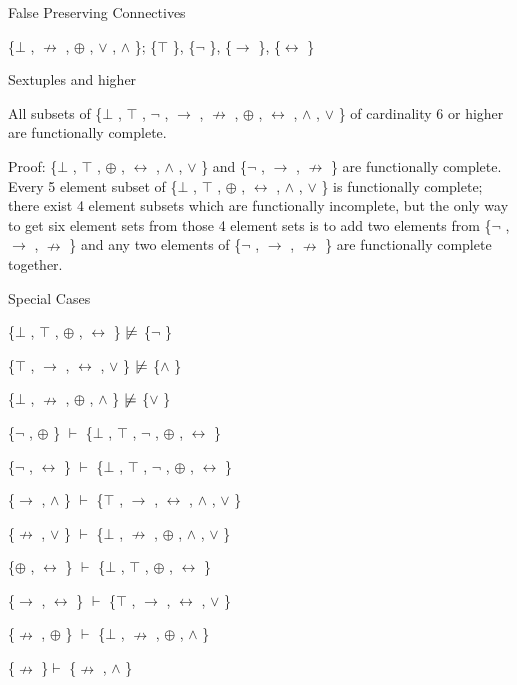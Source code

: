 \protect\hypertarget{anchor-28}{}{}False Preserving Connectives

\{$\bot$ , $\nrightarrow$ , $\oplus$ , $\lor$ , $\land$ \}; \{$\top$ \}, \{$\neg$ \}, \{$\to$ \}, \{$\leftrightarrow$ \}

\protect\hypertarget{anchor-29}{}{}Sextuples and higher

All subsets of \{$\bot$ , $\top$ , $\neg$ , $\to$ , $\nrightarrow$ , $\oplus$ , $\leftrightarrow$ , $\land$ , $\lor$ \} of cardinality 6 or higher
are functionally complete.

Proof: \{$\bot$ , $\top$ , $\oplus$ , $\leftrightarrow$ , $\land$ , $\lor$ \} and \{$\neg$ , $\to$ , $\nrightarrow$ \} are functionally complete.
Every 5 element subset of \{$\bot$ , $\top$ , $\oplus$ , $\leftrightarrow$ , $\land$ , $\lor$ \} is functionally complete;
there exist 4 element subsets which are functionally incomplete, but the
only way to get six element sets from those 4 element sets is to add two
elements from \{$\neg$ , $\to$ , $\nrightarrow$ \} and any two elements of \{$\neg$ , $\to$ , $\nrightarrow$ \} are
functionally complete together.

\protect\hypertarget{anchor-30}{}{}Special Cases

\{$\bot$ , $\top$ , $\oplus$ , $\leftrightarrow$ \} $\nmodels$  \{$\neg$ \}

\{$\top$ , $\to$ , $\leftrightarrow$ , $\lor$ \} $\nmodels$  \{$\land$ \}

\{$\bot$ , $\nrightarrow$ , $\oplus$ , $\land$ \} $\nmodels$  \{$\lor$ \}

\{$\neg$ , $\oplus$ \} $\vdash$  \{$\bot$ , $\top$ , $\neg$ , $\oplus$ , $\leftrightarrow$ \}

\{$\neg$ , $\leftrightarrow$ \} $\vdash$  \{$\bot$ , $\top$ , $\neg$ , $\oplus$ , $\leftrightarrow$ \}

\{$\to$ , $\land$ \} $\vdash$  \{$\top$ , $\to$ , $\leftrightarrow$ , $\land$ , $\lor$ \}

\{$\nrightarrow$ , $\lor$ \} $\vdash$  \{$\bot$ , $\nrightarrow$ , $\oplus$ , $\land$ , $\lor$ \}

\{$\oplus$ , $\leftrightarrow$ \} $\vdash$  \{$\bot$ , $\top$ , $\oplus$ , $\leftrightarrow$ \}

\{$\to$ , $\leftrightarrow$ \} $\vdash$  \{$\top$ , $\to$ , $\leftrightarrow$ , $\lor$ \}

\{$\nrightarrow$ , $\oplus$ \} $\vdash$  \{$\bot$ , $\nrightarrow$ , $\oplus$ , $\land$ \}

\{$\nrightarrow$ \}$\vdash$ \{$\nrightarrow$ , $\land$ \}

